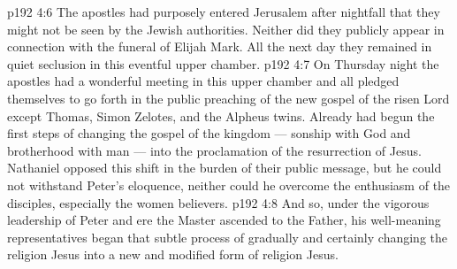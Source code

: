 \vs p192 4:6 \pc The apostles had purposely entered Jerusalem after nightfall that they might not be seen by the Jewish authorities. Neither did they publicly appear in connection with the funeral of Elijah Mark. All the next day they remained in quiet seclusion in this eventful upper chamber.
\vs p192 4:7 On Thursday night the apostles had a wonderful meeting in this upper chamber and all pledged themselves to go forth in the public preaching of the new gospel of the risen Lord except Thomas, Simon Zelotes, and the Alpheus twins. Already had begun the first steps of changing the gospel of the kingdom --- sonship with God and brotherhood with man --- into the proclamation of the resurrection of Jesus. Nathaniel opposed this shift in the burden of their public message, but he could not withstand Peter’s eloquence, neither could he overcome the enthusiasm of the disciples, especially the women believers.
\vs p192 4:8 And so, under the vigorous leadership of Peter and ere the Master ascended to the Father, his well\hyp{}meaning representatives began that subtle process of gradually and certainly changing the religion  Jesus into a new and modified form of religion  Jesus.
